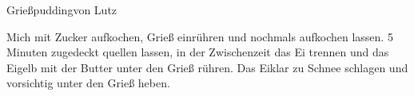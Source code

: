 \begin{recipe}{Grie{\ss}pudding}{von Lutz}
  \label{Griesspudding}
  \inglist

  \steps

  Mich mit Zucker aufkochen, Grieß einrühren und nochmals aufkochen lassen. 5
  Minuten zugedeckt quellen lassen, in der Zwischenzeit das Ei trennen und das
  Eigelb mit der Butter unter den Grieß rühren. Das Eiklar zu Schnee schlagen
  und vorsichtig unter den Grieß heben.

\end{recipe}
